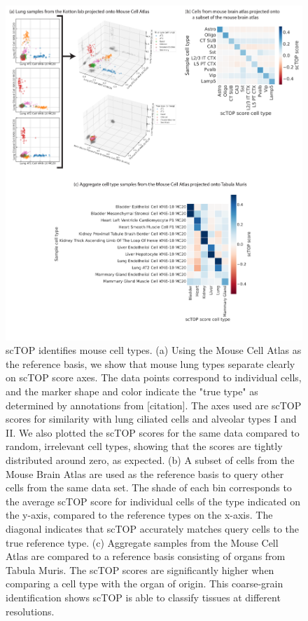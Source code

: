 \documentclass[aps,superscriptaddress, notitlepage,longbibliography]{revtex4-1}
\begin{document}
\begin{figure}
	\centering
		\includegraphics[scale=0.8]{figs/fig2.pdf}
	\caption{scTOP identifies mouse cell types. (a) Using the Mouse Cell Atlas as the reference basis, we show that mouse lung types separate clearly on scTOP score axes. The data points correspond to individual cells, and the marker shape and color indicate the "true type" as determined by annotations from [citation]. The axes used are scTOP scores for similarity with lung ciliated cells and alveolar types I and II. We also plotted the scTOP scores for the same data compared to random, irrelevant cell types, showing that the scores are tightly distributed around zero, as expected. (b) A subset of cells from the Mouse Brain Atlas are used as the reference basis to query other cells from the same data set. The shade of each bin corresponds to the average scTOP score for individual cells of the type indicated on the y-axis, compared to the reference types on the x-axis. The diagonal indicates that scTOP accurately matches query cells to the true reference type. (c) Aggregate samples from the Mouse Cell Atlas are compared to a reference basis consisting of organs from Tabula Muris. The scTOP scores are significantly higher when comparing a cell type with the organ of origin. This coarse-grain identification shows scTOP is able to classify tissues at different resolutions.}
	\label{FIG:2}
\end{figure}
\end{document}
